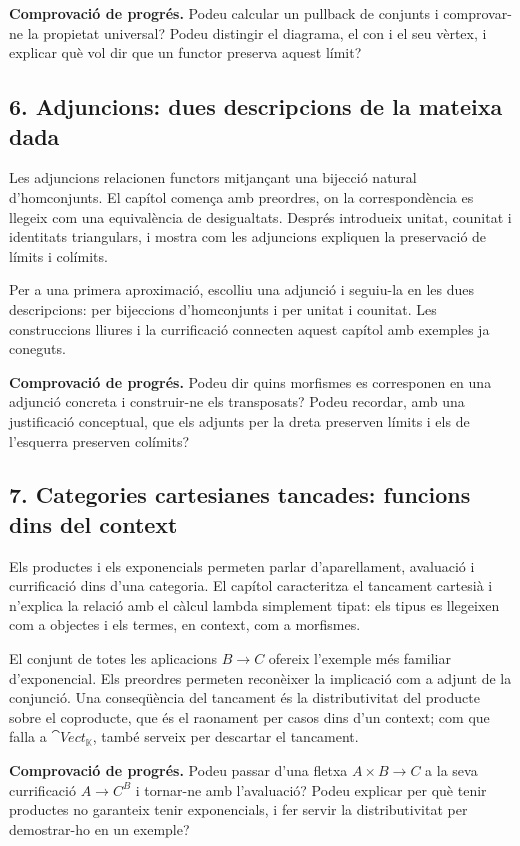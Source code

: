 \noindent\textbf{Comprovació de progrés.} Podeu calcular un pullback
de conjunts i comprovar-ne la propietat universal? Podeu
distingir el diagrama, el con i el seu vèrtex, i explicar
què vol dir que un functor preserva aquest límit?

\subsection*{6. Adjuncions: dues descripcions de la mateixa dada}

Les adjuncions relacionen functors mitjançant una bijecció
natural d'hom\-con\-junts. El capítol comença amb preordres,
on la correspondència es llegeix com una equivalència de
desigualtats. Després introdueix unitat, counitat i identitats
triangulars, i mostra com les adjuncions expliquen la preservació
de límits i colímits.

Per a una primera aproximació, escolliu una adjunció i seguiu-la
en les dues descripcions: per bijeccions d'homconjunts i per
unitat i counitat. Les construccions lliures i la currificació
connecten aquest capítol amb exemples ja coneguts.

\noindent\textbf{Comprovació de progrés.} Podeu dir quins morfismes
es corresponen en una adjunció concreta i construir-ne els
transposats? Podeu recordar, amb una justificació conceptual,
que els adjunts per la dreta preserven límits i els de
l'esquerra preserven colímits?

\subsection*{7. Categories cartesianes tancades: funcions dins del context}

Els productes i els exponencials permeten parlar d'aparellament,
avaluació i currificació dins d'una categoria. El capítol
caracteritza el tancament cartesià i n'explica la relació
amb el càlcul lambda simplement tipat: els tipus es llegeixen
com a objectes i els termes, en context, com a morfismes.

El conjunt de totes les aplicacions $B\to C$ ofereix l'exemple
més familiar d'exponencial. Els preordres permeten reconèixer
la implicació com a adjunt de la conjunció. Una conseqüència del
tancament és la distributivitat del producte sobre el coproducte,
que és el raonament per casos dins d'un context; com que falla a
$\cat{Vect}_{\mathbb K}$, també serveix per descartar el tancament.

\noindent\textbf{Comprovació de progrés.} Podeu passar d'una fletxa
$A\times B\to C$ a la seva currificació $A\to C^B$ i tornar-ne
amb l'avaluació? Podeu explicar per què tenir productes no
garanteix tenir exponencials, i fer servir la distributivitat
per demostrar-ho en un exemple?

